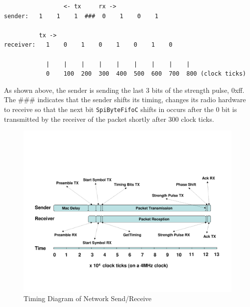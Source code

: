 \documentclass[11pt]{article}
\begin{document}
\small
\begin{verbatim}
       	         <- tx	   rx ->
sender:   1    1    1  ###  0    1    0    1

          tx ->				
receiver:   1    0    1    0    1    0    1    0

            |    |    |    |    |    |    |    |    |
            0    100  200  300  400  500  600  700  800 (clock ticks)
\end{verbatim}
\normalsize

As shown above, the sender is sending the last 3 bits of the strength
pulse, 0xff. The \#\#\# indicates that the sender shifts its timing,
changes its radio hardware to receive so that the next bit {\tt SpiByteFifoC}
shifts in occurs after the 0 bit is transmitted by the receiver of the
packet shortly after 300 clock ticks.

%

\begin{figure}
\centering
\includegraphics[scale=0.6,angle=-90]{fig/stack.pdf}
\caption{Timing Diagram of Network Send/Receive}
\label{fig:timing}
\end{figure}
\end{document}
